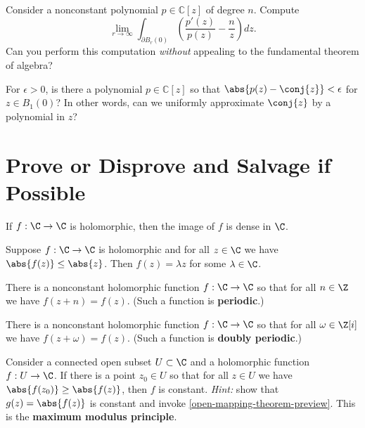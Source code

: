 \documentclass{homework}
\begin{document}
\begin{problem}
  Consider a nonconstant polynomial $p \in \mathbb{C}[z]$ of degree $n$.  Compute
  \[
    \lim_{r \to \infty} \int_{\partial B_r(0)} \left( \frac{p'(z)}{p(z)} - \frac{n}{z} \right) dz.
  \]
  Can you perform this computation \textit{without} appealing to the
  fundamental theorem of algebra?
\end{problem}

\begin{problem}\label{uniformly-approximate-conj}For $\epsilon > 0$, is there a polynomial $p \in \mathbb{C}[z]$ so
  that $\abs{p(z) - \conj{z}} < \epsilon$ for $z \in B_1(0)$?  In
  other words, can we uniformly approximate $\conj{z}$ by a polynomial
  in $z$?
\end{problem}

\section{Prove or Disprove and Salvage if Possible}

\begin{problem}\label{entire-is-dense}If $f : \C \to \C$ is
  holomorphic, then the image of $f$ is dense in $\C$.
\end{problem}

\begin{problem}\label{identity-dominate-entire}Suppose $f : \C \to \C$
  is holomorphic and for all $z \in \C$ we have
  $\abs{f(z)} \leq \abs{z}$.  Then $f(z) = \lambda z$ for some
  $\lambda \in \C$.
\end{problem}

\begin{problem}
  There is a nonconstant holomorphic function $f : \C \to \C$ so that
  for all $n \in \Z$ we have $f(z + n) = f(z)$.  (Such a function is
  \textbf{periodic}.)
\end{problem}

\begin{problem}\label{doubly-periodic}There is a nonconstant holomorphic function $f : \C \to \C$ so that
  for all $\omega \in \Z[i]$ we have $f(z + \omega) = f(z)$.  (Such a
  function is \textbf{doubly periodic}.)
\end{problem}

\begin{problem}\label{maximum-modulus-principle}Consider a connected open subset $U \subset \C$ and a holomorphic
  function $f : U \to \C$.  If there is a point $z_0 \in U$ so that
  for all $z \in U$ we have $\abs{f(z_0)} \geq \abs{f(z)}$, then $f$
  is constant.  \textit{Hint:} show that $g(z) = \abs{f(z)}$ is
  constant and invoke \ref{open-mapping-theorem-preview}.  This is the
  \textbf{maximum modulus principle}.
\end{problem}
\end{document}
